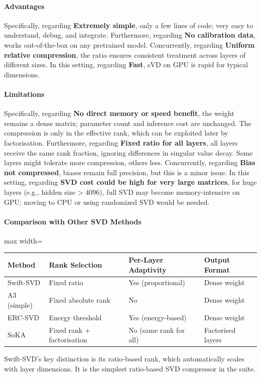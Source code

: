 \paragraph{Advantages}

Specifically, regarding \textbf{Extremely simple}, only a few lines of code; very easy to understand, debug, and integrate. Furthermore, regarding \textbf{No calibration data}, works out-of-the-box on any pretrained model. Concurrently, regarding \textbf{Uniform relative compression}, the ratio ensures consistent treatment across layers of different sizes. In this setting, regarding \textbf{Fast}, sVD on GPU is rapid for typical dimensions.


\paragraph{Limitations}

Specifically, regarding \textbf{No direct memory or speed benefit}, the weight remains a dense matrix; parameter count and inference cost are unchanged. The compression is only in the effective rank, which can be exploited later by factorisation. Furthermore, regarding \textbf{Fixed ratio for all layers}, all layers receive the same rank fraction, ignoring differences in singular value decay. Some layers might tolerate more compression, others less. Concurrently, regarding \textbf{Bias not compressed}, biases remain full precision, but this is a minor issue. In this setting, regarding \textbf{SVD cost could be high for very large matrices}, for huge layers (e.g., hidden size > 4096), full SVD may become memory-intensive on GPU; moving to CPU or using randomized SVD would be needed.


\paragraph{Comparison with Other SVD Methods}

\begin{center}
\begin{adjustbox}{max width=\columnwidth}
\renewcommand{\arraystretch}{1.2}
\begin{tabular}{llll}
\toprule
Method & Rank Selection & Per-Layer Adaptivity & Output Format \\
\midrule
Swift-SVD & Fixed ratio & Yes (proportional) & Dense weight \\
A3 (simple) & Fixed absolute rank & No & Dense weight \\
ERC-SVD & Energy threshold & Yes (energy-based) & Dense weight \\
SoKA & Fixed rank + factorisation & No (same rank for all) & Factorised layers \\

\bottomrule
\end{tabular}
\end{adjustbox}
\end{center}
Swift-SVD's key distinction is its ratio-based rank, which automatically scales with layer dimensions. It is the simplest ratio-based SVD compressor in the suite.



